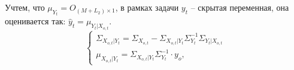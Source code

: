 \documentclass[11pt]{article}
\begin{document}
Учтем, что $\mu_{Y_t} = O_{(M+L_2) \times 1}$, в рамках задачи $y_t$ -- скрытая переменная, она оценивается так: $\hat{y}_t = \mu_{Y_t|X_{o,t}}$.
\begin{equation}
\left\{ \begin{gathered} 
\Sigma_{X_{o,t}|Y_t} = \Sigma_{X_{o,t}}-\Sigma_{X_{o,t}|Y_t}\Sigma_{Y_t}^{-1}\Sigma_{Y_t|X_{o,t}} \\
\mu_{X_{o,t}|Y_t} = \Sigma_{X_{o,t}|Y_t}\Sigma_{Y_t}^{-1}\cdot y_o,
\end{gathered} \right.
\end{equation}
\end{document}
